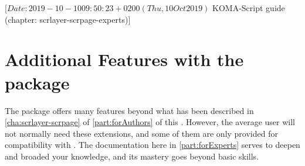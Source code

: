 %
%
%
%
%
%
%
%
% 
%
%
%
%

%
                 [$Date: 2019-10-10 09:50:23 +0200 (Thu, 10 Oct 2019) $
                  KOMA-Script guide (chapter: scrlayer-scrpage-experts)]


\chapter[{Additional Features of \Package{scrlayer-scrpage}}]
  {Additional Features with
    the  package}
%
\BeginIndexGroup
{}%
The  package offers many features beyond what has
been described in \autoref{cha:scrlayer-scrpage} of \autoref{part:forAuthors}
of this . However, the average user will not normally need
these extensions, and some of them are only provided for compatibility with
. The documentation here in \autoref{part:forExperts} serves
to deepen and broaded your knowledge, and its mastery goes beyond basic
skills.

